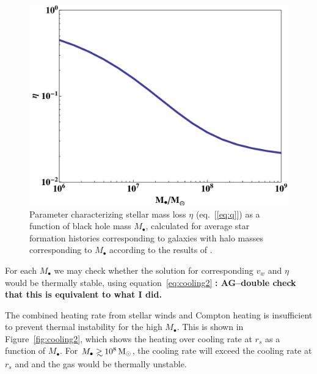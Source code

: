 \documentclass[usenatbib,fleqn]{mn2e}
\newcommand\gsim{\mathrel{\rlap{\lower4pt\hbox{\hskip1pt$\sim$}}
    \raise1pt\hbox{$>$}}}
\newcommand{\rs}{r_s}
\newcommand{\Mbh}[1][]{M_{\bullet#1}}
\newcommand{\vwO}{v_{w}}
\begin{document}
\begin{figure}
\includegraphics[width=\columnwidth]{eta.pdf}
\caption{\label{fig:eta} Parameter characterizing stellar mass loss $\eta$ (eq.~[\ref{eq:q}]) as a function of black hole mass $\Mbh$, calculated for average star formation histories corresponding to galaxies with halo masses corresponding to $\Mbh$ according to the results of \citet{MosterNaab+:2013a}. }
\end{figure}

For each $\Mbh$ we may check whether the solution for corresponding
$\vwO$ and $\eta$ would be thermally stable, using
equation~\eqref{eq:cooling2} {\bf: AG--double check that this is
  equivalent to what I did.}

The combined heating rate from stellar winds and Compton heating is
insufficient to prevent thermal instability for the high $\Mbh$.  This
is shown in Figure~\ref{fig:cooling2}, which shows the heating over
cooling rate at $\rs$ as a function of $\Mbh$. For $\Mbh\gsim 10^8
\Msun$, the cooling rate will exceed the cooling rate at $\rs$ and
and the gas would be thermally unstable.
\end{document}
